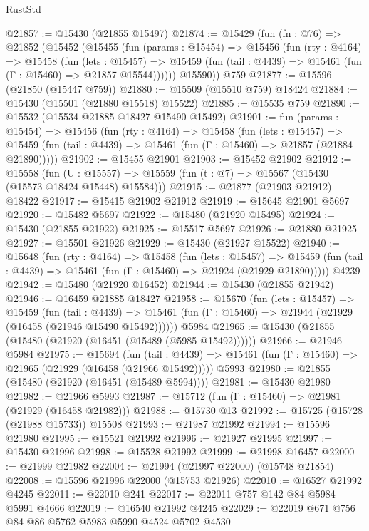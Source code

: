 \begin{lexlean}{RustStd}
\begin{coremodule}
@21857 := @15430 (@21855 @15497)
@21874 := @15429
    (fun (fn : @76) =>
    @21852
      (@15452
        (@15455
          (fun (params : @15454) =>
          @15456
            (fun (rty : @4164) =>
            @15458
              (fun (lets : @15457) =>
              @15459 (fun (tail : @4439) => @15461 (fun (Γ : @15460) => @21857 @15544))))))
        @15590))
    @759
@21877 := @15596 (@21850 (@15447 @759))
@21880 := @15509 (@15510 @759) @18424
@21884 := @15430 (@15501 (@21880 @15518) @15522)
@21885 := @15535 @759
@21890 := @15532 (@15534 @21885 @18427 @15490 @15492)
@21901 := fun (params : @15454) =>
  @15456
    (fun (rty : @4164) =>
    @15458
      (fun (lets : @15457) =>
      @15459 (fun (tail : @4439) => @15461 (fun (Γ : @15460) => @21857 (@21884 @21890)))))
@21902 := @15455 @21901
@21903 := @15452 @21902
@21912 := @15558
    (fun (U : @15557) => @15559 (fun (t : @7) => @15567 (@15430 (@15573 @18424 @15448) @15584)))
@21915 := @21877 (@21903 @21912) @18422
@21917 := @15415 @21902 @21912
@21919 := @15645 @21901 @5697
@21920 := @15482 @5697
@21922 := @15480 (@21920 @15495)
@21924 := @15430 (@21855 @21922)
@21925 := @15517 @5697
@21926 := @21880 @21925
@21927 := @15501 @21926
@21929 := @15430 (@21927 @15522)
@21940 := @15648
    (fun (rty : @4164) =>
    @15458
      (fun (lets : @15457) =>
      @15459 (fun (tail : @4439) => @15461 (fun (Γ : @15460) => @21924 (@21929 @21890)))))
    @4239
@21942 := @15480 (@21920 @16452)
@21944 := @15430 (@21855 @21942)
@21946 := @16459 @21885 @18427
@21958 := @15670
    (fun (lets : @15457) =>
    @15459
      (fun (tail : @4439) =>
      @15461 (fun (Γ : @15460) => @21944 (@21929 (@16458 (@21946 @15490 @15492))))))
    @5984
@21965 := @15430 (@21855 (@15480 (@21920 (@16451 (@15489 (@5985 @15492))))))
@21966 := @21946 @5984
@21975 := @15694
    (fun (tail : @4439) => @15461 (fun (Γ : @15460) => @21965 (@21929 (@16458 (@21966 @15492)))))
    @5993
@21980 := @21855 (@15480 (@21920 (@16451 (@15489 @5994))))
@21981 := @15430 @21980
@21982 := @21966 @5993
@21987 := @15712 (fun (Γ : @15460) => @21981 (@21929 (@16458 @21982)))
@21988 := @15730 @13
@21992 := @15725 (@15728 (@21988 @15733)) @15508
@21993 := @21987 @21992
@21994 := @15596 @21980
@21995 := @15521 @21992
@21996 := @21927 @21995
@21997 := @15430 @21996
@21998 := @15528 @21992
@21999 := @21998 @16457
@22000 := @21999 @21982
@22004 := @21994 (@21997 @22000) (@15748 @21854)
@22008 := @15596 @21996 @22000 (@15753 @21926)
@22010 := @16527 @21992 @4245
@22011 := @22010 @241
@22017 := @22011 @757 @142 @84 @5984 @5991 @4666
@22019 := @16540 @21992 @4245
@22029 := @22019 @671 @756 @84 @86 @5762 @5983 @5990 @4524 @5702 @4530

\end{coremodule}
\end{lexlean}
